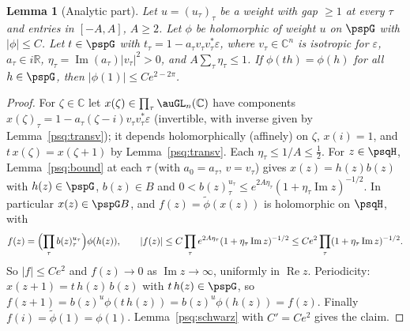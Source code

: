 \documentclass[10pt]{amsart}
\newtheorem{lemma}[theorem]{Lemma}
\theoremstyle{definition}
\theoremstyle{remark}
\newcommand{\C}{\mathbb C}
\newcommand{\R}{\mathbb R}
\newcommand{\Rel}{\operatorname{Re}}
\newcommand{\Iml}{\operatorname{Im}}
\begin{document}
\begin{lemma}[Analytic part]\label{psq:analytic}
Let $u=(u_\tau)_\tau$ be a weight with gap $\ge1$ at every $\tau$ and entries in $[-A,A]$, $A\ge2$. Let
$\phi$ be holomorphic of weight $u$ on $\pspG$ with $|\phi|\le C$. Let $t\in\pspG$ with
$t_\tau=1-a_\tau v_\tau v_\tau^*\varepsilon$, where $v_\tau\in\C^n$ is isotropic for $\varepsilon$,
$a_\tau\in i\R$, $\eta_\tau=\Iml(a_\tau)|v_\tau|^2>0$, and $A\sum_\tau\eta_\tau\le1$. If $\phi(th)=\phi(h)$
for all $h\in\pspG$, then $|\phi(1)|\le Ce^{2-2\pi}$.
\end{lemma}
\begin{proof}
For $\zeta\in\C$ let $x(\zeta)\in\prod_\tau\auGL_n(\C)$ have components $x(\zeta)_\tau=1-a_\tau(\zeta-i)
v_\tau v_\tau^*\varepsilon$ (invertible, with inverse given by Lemma~\ref{psq:transv}); it depends
holomorphically (affinely) on $\zeta$, $x(i)=1$, and $t\,x(\zeta)=x(\zeta+1)$ by Lemma~\ref{psq:transv}.
Each $\eta_\tau\le1/A\le\frac12$. For $z\in\psqH$, Lemma~\ref{psq:bound} at each $\tau$ (with
$a_0=a_\tau$, $v=v_\tau$) gives $x(z)=h(z)b(z)$ with $h(z)\in\pspG$, $b(z)\in B$ and
$0<b(z)_\tau^{u_\tau}\le e^{2A\eta_\tau}(1+\eta_\tau\Iml z)^{-1/2}$. In particular $x(z)\in\pspG B$, and
$f(z)=\tilde\phi(x(z))$ is holomorphic on $\psqH$, with
\[
f(z)=\Bigl(\prod_\tau b(z)_\tau^{u_\tau}\Bigr)\phi(h(z)),\qquad |f(z)|\le C\prod_\tau e^{2A\eta_\tau}
(1+\eta_\tau\Iml z)^{-1/2}\le Ce^{2}\prod_\tau(1+\eta_\tau\Iml z)^{-1/2}.
\]
So $|f|\le Ce^2$ and $f(z)\to0$ as $\Iml z\to\infty$, uniformly in $\Rel z$. Periodicity:
$x(z+1)=t\,h(z)\,b(z)$ with $t\,h(z)\in\pspG$, so $f(z+1)=b(z)^u\phi(t\,h(z))=b(z)^u\phi(h(z))=f(z)$.
Finally $f(i)=\tilde\phi(1)=\phi(1)$. Lemma~\ref{psq:schwarz} with $C'=Ce^2$ gives the claim.
\end{proof}
\end{document}
